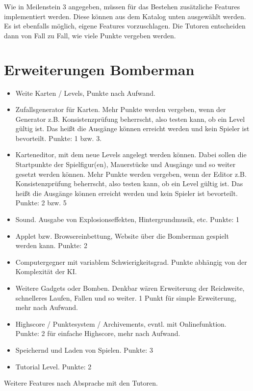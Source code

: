 \documentclass{programmierpraktikum}
\subtitle{Bomberman}
\begin{document}
\maketitle
Wie in Meilenstein 3 angegeben, müssen für das Bestehen zusätzliche Features implementiert werden. Diese können aus dem Katalog unten ausgewählt werden. Es ist ebenfalls möglich, eigene Features vorzuschlagen. Die Tutoren entscheiden dann von Fall zu Fall, wie viele Punkte vergeben werden.
\section{Erweiterungen Bomberman}
\begin{itemize}
  \item Weite Karten / Levels, Punkte nach Aufwand.
  \item Zufallsgenerator für Karten. Mehr Punkte werden vergeben, wenn der Generator z.B. Konsistenzprüfung beherrscht, also testen kann, ob ein Level gültig ist. Das heißt die Ausgänge können erreicht werden und kein Spieler ist bevorteilt. Punkte: 1 bzw. 3.
  \item Karteneditor, mit dem neue Levels angelegt werden können. Dabei sollen die Startpunkte der Spielfigur(en), Mauerstücke und Ausgänge und so weiter gesetzt werden können. Mehr Punkte werden vergeben, wenn der Editor z.B. Konsistenzprüfung beherrscht, also testen kann, ob ein Level gültig ist. Das heißt die Ausgänge können erreicht werden und kein Spieler ist bevorteilt. Punkte: 2 bzw. 5
  \item Sound. Ausgabe von Explosionseffekten, Hintergrundmusik, etc. Punkte: 1
  \item Applet bzw. Browsereinbettung, Website über die Bomberman gespielt werden kann. Punkte: 2
  \item Computergegner mit variablem Schwierigkeitsgrad. Punkte abhängig von der Komplexität der KI.
  \item Weitere Gadgets oder Bomben. Denkbar wären Erweiterung der Reichweite, schnelleres Laufen, Fallen und so weiter. 1 Punkt für simple Erweiterung, mehr nach Aufwand.
  \item Highscore / Punktesystem / Archivements, evntl. mit Onlinefunktion. Punkte: 2 für einfache Highscore, mehr nach Aufwand.
  \item Speichernd und Laden von Spielen. Punkte: 3
  \item Tutorial Level. Punkte: 2
\end{itemize}
Weitere Features nach Absprache mit den Tutoren.
\end{document}
